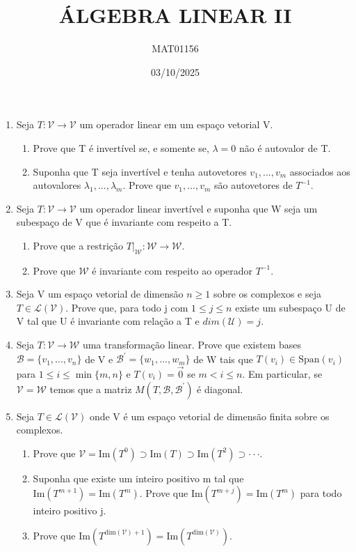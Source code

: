 \documentclass[12pt]{article}
\title{ÁLGEBRA LINEAR II}
\author{MAT01156}
\date{03/10/2025}
\begin{document}
\maketitle

\begin{enumerate}
    \item Seja $T: \mathcal{V} \rightarrow \mathcal{V}$ um operador linear em um espaço vetorial V.
    \begin{enumerate}
        \item Prove que T é invertível se, e somente se, $\lambda=0$ não é autovalor de T.
        \item Suponha que T seja invertível e tenha autovetores $v_{1},...,v_{m}$ associados aos autovalores $\lambda_{1},...,\lambda_{m}$. Prove que $v_{1},...,v_{m}$ são autovetores de $T^{-1}$.
    \end{enumerate}

    \item Seja $T: \mathcal{V} \rightarrow \mathcal{V}$ um operador linear invertível e suponha que W seja um subespaço de V que é invariante com respeito a T.
    \begin{enumerate}
        \item Prove que a restrição $T|_{\mathcal{W}}: \mathcal{W} \rightarrow \mathcal{W}$.
        \item Prove que $\mathcal{W}$ é invariante com respeito ao operador $T^{-1}$.
    \end{enumerate}

    \item Seja V um espaço vetorial de dimensão $n \ge 1$ sobre os complexos e seja $T \in \mathcal{L}(\mathcal{V})$. Prove que, para todo j com $1 \le j \le n$ existe um subespaço U de V tal que U é invariante com relação a T e $dim(\mathcal{U})=j$.

    \item Seja $T: \mathcal{V} \rightarrow \mathcal{W}$ uma transformação linear. Prove que existem bases $\mathcal{B}=\{v_{1},...,v_{n}\}$ de V e $\mathcal{B}^{\prime}=\{w_{1},...,w_{m}\}$ de W tais que $T(v_{i}) \in \text{Span}(v_{i})$ para $1 \le i \le \min\{m,n\}$ e $T(v_{i})=\vec{0}$ se $m<i \le n$. Em particular, se $\mathcal{V}=\mathcal{W}$ temos que a matriz $M(T,\mathcal{B},\mathcal{B}^{\prime})$ é diagonal.

    \item Seja $T \in \mathcal{L}(\mathcal{V})$ onde V é um espaço vetorial de dimensão finita sobre os complexos.
    \begin{enumerate}
        \item Prove que $\mathcal{V} = \text{Im}(T^{0}) \supset \text{Im}(T) \supset \text{Im}(T^{2}) \supset \cdot\cdot\cdot$.
        \item Suponha que existe um inteiro positivo m tal que $\text{Im}(T^{m+1})=\text{Im}(T^{m})$. Prove que $\text{Im}(T^{m+j})=\text{Im}(T^{m})$ para todo inteiro positivo j.
        \item Prove que $\text{Im}(T^{\text{dim}(\mathcal{V})+1})=\text{Im}(T^{\text{dim}(\mathcal{V})})$.
    \end{enumerate}


\end{enumerate}
\end{document}
